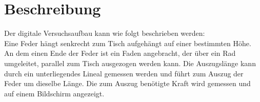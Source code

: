 \section{Beschreibung}
\label{sec:Beschreibung}
Der digitale Versuchsaufbau kann wie folgt beschrieben werden: \\
Eine Feder hängt senkrecht zum Tisch aufgehängt auf einer bestimmten Höhe. 
An dem einen Ende der Feder ist ein Faden angebracht, der über ein Rad umgeleitet, parallel zum Tisch ausgezogen werden kann.
Die Auszugslänge kann durch ein unterliegendes Lineal gemessen werden und führt zum Auszug der Feder um dieselbe Länge.
Die zum Auszug benötigte Kraft wird gemessen und auf einem Bildschirm angezeigt. 
